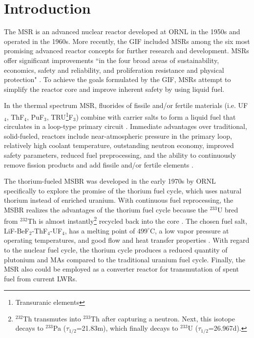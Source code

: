 \section{Introduction}
The \gls{MSR} is an advanced nuclear reactor developed at \gls{ORNL} 
in the 1950s and operated in the 1960s. More recently, the \gls{GIF}  
included \glspl{MSR} among the six most promising advanced reactor concepts for 
further research and development. 
\glspl{MSR} offer significant improvements ``in the four broad areas of 
sustainability, economics, safety and reliability, and proliferation resistance 
and physical protection" \cite{doe_technology_2002}. To achieve the goals 
formulated by the GIF, \glspl{MSR} attempt to simplify the reactor core and 
improve inherent safety by using liquid fuel.

In the thermal spectrum \gls{MSR}, fluorides of fissile and/or fertile 
materials (i.e. UF$_4$, ThF$_4$,  PuF$_3$, TRU\footnote{ Transuranic 
elements}F$_3$) combine with carrier salts to form a liquid fuel that 
circulates in a loop-type primary circuit \cite{haubenreich_experience_1970}. 
Immediate advantages over traditional, solid-fueled, reactors include 
near-atmospheric pressure in the primary loop, 
relatively high coolant temperature, outstanding neutron economy, improved 
safety parameters, reduced fuel preprocessing, and the ability to continuously 
remove fission products and add fissile and/or fertile elements 
\cite{leblanc_molten_2010}. 

The thorium-fueled \gls{MSBR} was developed in the 
early 1970s by \gls{ORNL} specifically to explore the promise of the thorium 
fuel cycle, which uses natural thorium instead of enriched uranium. With 
continuous fuel reprocessing, the \gls{MSBR} realizes the advantages of the 
thorium fuel cycle because the $^{233}$U bred from 
$^{232}$Th is almost instantly\footnote{\space $^{232}$Th transmutes into 
$^{233}$Th after capturing a neutron. Next, this isotope decays to $^{233}$Pa 
($\tau_{1/2}$=21.83m), which finally decays to $^{233}$U 
($\tau_{1/2}$=26.967d).} recycled back into the core 
\cite{betzler_modeling_2016}. The chosen fuel salt, LiF-BeF$_2$-ThF$_4$-UF$_4$, has a 
melting point of $499^\circ$C, a low vapor pressure at operating temperatures, 
and good flow and heat transfer properties \cite{robertson_conceptual_1971}. 
With regard to the nuclear fuel cycle, the thorium cycle produces a reduced quantity 
of plutonium and \glspl{MA} compared to the traditional uranium fuel cycle. 
Finally, the \gls{MSR} also could be employed as a converter reactor for 
transmutation of spent fuel from current \glspl{LWR}.

